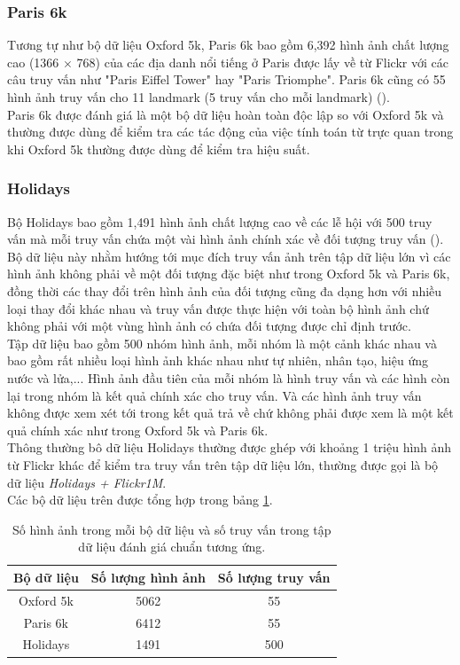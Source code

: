 \subsubsection{Paris 6k}
Tương tự như bộ dữ liệu Oxford 5k, Paris 6k bao gồm 6,392 hình ảnh chất lượng cao (1366 $\times$ 768) của các địa danh nổi tiếng ở Paris được lấy về từ Flickr với các câu truy vấn như "Paris Eiffel Tower" hay "Paris Triomphe". Paris 6k cũng có 55 hình ảnh truy vấn cho 11 landmark (5 truy vấn cho mỗi landmark) (\cite{philbin2008lost}).\\
Paris 6k được đánh giá là một bộ dữ liệu hoàn toàn độc lập so với Oxford 5k và thường được dùng để kiểm tra các tác động của việc tính toán từ trực quan trong khi Oxford 5k thường được dùng để kiểm tra hiệu suất.\\

\subsubsection{Holidays}
Bộ Holidays bao gồm 1,491 hình ảnh chất lượng cao về các lễ hội với 500 truy vấn mà mỗi truy vấn chứa một vài hình ảnh chính xác về đối tượng truy vấn (\cite{JDS08}). Bộ dữ liệu này nhằm hướng tới mục đích truy vấn ảnh trên tập dữ liệu lớn vì các hình ảnh không phải về một đối tượng đặc biệt như trong Oxford 5k và Paris 6k, đồng thời các thay đổi trên hình ảnh của đối tượng cũng đa dạng hơn với nhiều loại thay đổi khác nhau và truy vấn được thực hiện với toàn bộ hình ảnh chứ không phải với một vùng hình ảnh có chứa đối tượng được chỉ định trước.\\
Tập dữ liệu bao gồm 500 nhóm hình ảnh, mỗi nhóm là một cảnh khác nhau và bao gồm rất nhiều loại hình ảnh khác nhau như tự nhiên, nhân tạo, hiệu ứng nước và lửa,... Hình ảnh đầu tiên của mỗi nhóm là hình truy vấn và các hình còn lại trong nhóm là kết quả chính xác cho truy vấn. Và các hình ảnh truy vấn không được xem xét tới trong kết quả trả về chứ không phải được xem là một kết quả chính xác như trong Oxford 5k và Paris 6k.\\
Thông thường bô dữ liệu Holidays thường được ghép với khoảng 1 triệu hình ảnh từ Flickr khác để kiểm tra truy vấn trên tập dữ liệu lớn, thường được gọi là bộ dữ liệu \textit{Holidays + Flickr1M}.\\

Các bộ dữ liệu trên được tổng hợp trong bảng \ref{table:dataset}.
\begin{table}
\begin{center}
	\begin{tabular}{c c c}
	\hline
	Bộ dữ liệu & Số lượng hình ảnh & Số lượng truy vấn \\ \hline
    Oxford 5k & 5062 & 55 \\ 
    Paris 6k & 6412 & 55 \\
    Holidays & 1491 & 500 \\
	\hline
	\end{tabular}
\end{center}
\caption[Số hình ảnh trong mỗi bộ dữ liệu và số truy vấn trong tập dữ liệu đánh giá chuẩn tương ứng]{Số hình ảnh trong mỗi bộ dữ liệu và số truy vấn trong tập dữ liệu đánh giá chuẩn tương ứng.}
\label{table:dataset}
\end{table}

